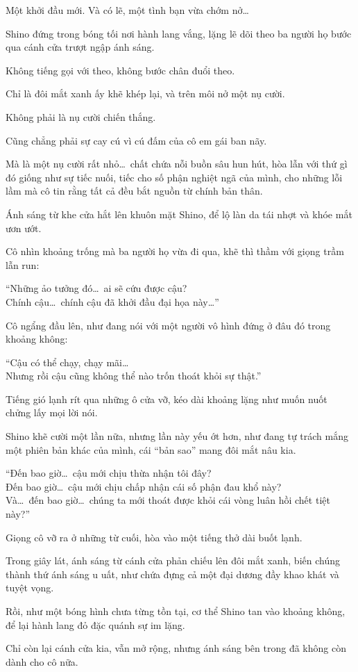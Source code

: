 \documentclass[../main.tex]{subfiles}
\begin{document}
Một khởi đầu mới. Và có lẽ, một tình bạn vừa chớm nở\dots

\pov{-}

Shino đứng trong bóng tối nơi hành lang vắng, lặng lẽ dõi theo ba người họ bước qua cánh cửa trượt ngập ánh sáng.

Không tiếng gọi với theo, không bước chân đuổi theo.

Chỉ là đôi mắt xanh ấy khẽ khép lại, và trên môi nở một nụ cười.

Không phải là nụ cười chiến thắng.

Cũng chẳng phải sự cay cú vì cú đấm của cô em gái ban nãy.

Mà là một nụ cười rất nhỏ\dots\ chất chứa nỗi buồn sâu hun hút, hòa lẫn với thứ gì đó giống như sự tiếc nuối, tiếc cho số phận nghiệt ngã của mình, cho những lỗi lầm mà cô tin rằng tất cả đều bắt nguồn từ chính bản thân.

Ánh sáng từ khe cửa hắt lên khuôn mặt Shino, để lộ làn da tái nhợt và khóe mắt ươn ướt.


Cô nhìn khoảng trống mà ba người họ vừa đi qua, khẽ thì thầm với giọng trầm lẫn run:

\begin{center}
  ``Những ảo tưởng đó\dots\ ai sẽ cứu được cậu?\\
  Chính cậu\dots\ chính cậu đã khởi đầu đại họa này\dots''
\end{center}

Cô ngẩng đầu lên, như đang nói với một người vô hình đứng ở đâu đó trong khoảng không:

\begin{center}
  ``Cậu có thể chạy, chạy mãi\dots\\
  Nhưng rồi cậu cũng không thể nào trốn thoát khỏi sự thật.''
\end{center}

Tiếng gió lạnh rít qua những ô cửa vỡ, kéo dài khoảng lặng như muốn nuốt chửng lấy mọi lời nói.

Shino khẽ cười một lần nữa, nhưng lần này yếu ớt hơn, như đang tự trách mắng một phiên bản khác của mình, cái ``bản sao'' mang đôi mắt nâu kia.

\begin{center}
  ``Đến bao giờ\dots\ cậu mới chịu thừa nhận tôi đây?\\
  Đến bao giờ\dots\ cậu mới chịu chấp nhận cái số phận đau khổ này?\\
  Và\dots\ đến bao giờ\dots\ chúng ta mới thoát được khỏi cái vòng luân hồi chết tiệt này?''
\end{center}

Giọng cô vỡ ra ở những từ cuối, hòa vào một tiếng thở dài buốt lạnh.

Trong giây lát, ánh sáng từ cánh cửa phản chiếu lên đôi mắt xanh, biến chúng thành thứ ánh sáng u uất, như chứa đựng cả một đại dương đầy khao khát và tuyệt vọng.

Rồi, như một bóng hình chưa từng tồn tại, cơ thể Shino tan vào khoảng không, để lại hành lang đỏ đặc quánh sự im lặng.

Chỉ còn lại cánh cửa kia, vẫn mở rộng, nhưng ánh sáng bên trong đã không còn dành cho cô nữa.
\end{document}
